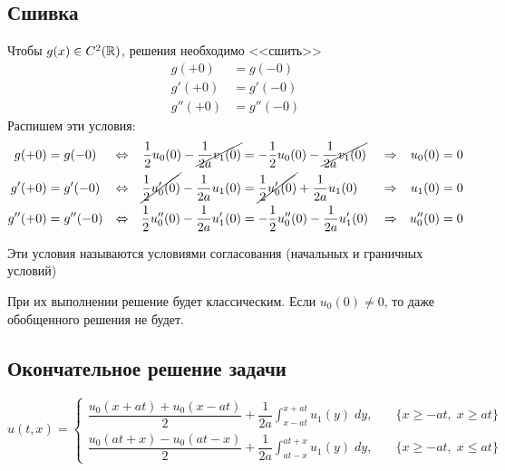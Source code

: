 \documentclass[../main.tex]{subfiles}
\begin{document}
\subsection{Сшивка}
Чтобы $g(x) \in C^2(\mathbb{R})$, решения необходимо <<сшить>>
\begin{align*}
    g(+0) &= g(-0) \\
    g'(+0) &= g'(-0) \\
    g''(+0) &= g''(-0)
\end{align*}
Распишем эти условия:
\begin{align*}
     g(+0) &= g(-0) &\Leftrightarrow&& 
    \frac{1}{2}u_0(0) - \cancel{\frac{1}{2a}v_1(0)} &= -\frac{1}{2}u_0(0) - \cancel{\frac{1}{2a}v_1(0)} &&\Rightarrow& u_0(0) &= 0 \\
     g'(+0) &= g'(-0) &\Leftrightarrow&& \cancel{\frac{1}{2}u'_0(0)} - \frac{1}{2a}u_1(0) &=
    \cancel{\frac{1}{2}u'_0(0)} + \frac{1}{2a}u_1(0) &&\Rightarrow& u_1(0) &= 0 \\
     g''(+0) &= g''(-0) &\Leftrightarrow&& \frac{1}{2} u''_0(0) - \frac{1}{2a} u_1'(0) &= -\frac{1}{2}u_0''(0) - \frac{1}{2a} u_1'(0) &&\Rightarrow& u_0''(0) &= 0
\end{align*}

\begin{definition}
    Эти условия называются условиями согласования (начальных и граничных условий)
\end{definition}

При их выполнении решение будет классическим. Если $u_0(0) \ne 0$, то даже обобщенного решения не будет.

\subsection{Окончательное решение задачи}

\begin{equation} \label{4_2}
        u(t, x) = \begin{cases}
            \dfrac{u_0(x+at) + u_0(x-at)}{2} + \dfrac{1}{2a}\displaystyle\int_{x-at}^{x+at}u_1(y)\;dy,\quad & \{x\geq -at,\; x\geq at\} \\[0.8em]

            \dfrac{u_0(at+x) - u_0(at-x)}{2} + \dfrac{1}{2a}\displaystyle\int_{at-x}^{at+x}u_1(y)\;dy,\quad & \{x\geq -at,\; x\leq at\}
        \end{cases}
\end{equation}
\vspace{0pt}
\end{document}
